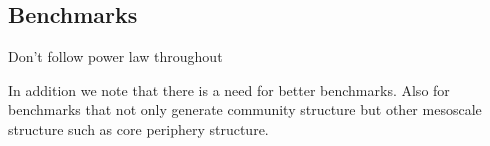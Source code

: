 \subsection{Benchmarks}
Don't follow power law throughout


In addition we note that there is a need for better benchmarks. Also for benchmarks that not only generate community structure but other mesoscale structure such as core periphery structure. 